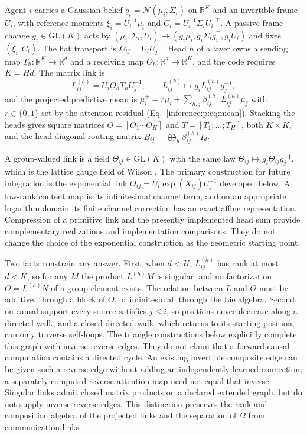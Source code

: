 \documentclass[11pt]{article}
\theoremstyle{definition}
\theoremstyle{remark}
\providecommand{\GL}{\mathrm{GL}}
\begin{document}
Agent $i$ carries a Gaussian belief $q_i=\mathcal N(\mu_i,\Sigma_i)$ on $\mathbb R^K$ and an invertible frame $U_i$, with reference moments $\xi_i=U_i^{-1}\mu_i$ and $C_i=U_i^{-1}\Sigma_iU_i^{-\top}$. A passive frame change $g_i\in\GL(K)$ acts by $(\mu_i,\Sigma_i,U_i)\mapsto(g_i\mu_i,g_i\Sigma_ig_i^\top,g_iU_i)$ and fixes $(\xi_i,C_i)$. The flat transport is $\Omega_{ij}=U_iU_j^{-1}$. Head $h$ of a layer owns a sending map $T_h:\mathbb R^K\to\mathbb R^d$ and a receiving map $O_h:\mathbb R^d\to\mathbb R^K$, and the code requires $K=Hd$. The matrix link is
\begin{equation}
L_{ij}^{(h)}=U_iO_hT_hU_j^{-1},\qquad L_{ij}^{(h)}\mapsto g_iL_{ij}^{(h)}g_j^{-1},
\label{links:origin:eq:link}
\end{equation}
and the projected predictive mean is $\mu_i^+=r\mu_i+\sum_{h,j}\beta_{ij}^{(h)}L_{ij}^{(h)}\mu_j$ with $r\in\{0,1\}$ set by the attention residual (Eq.~\eqref{inference:p:eq:mean}). Stacking the heads gives square matrices $O=[O_1\cdots O_H]$ and $T=[T_1;\dots;T_H]$, both $K\times K$, and the head-diagonal routing matrix $B_{ij}=\bigoplus_h\beta_{ij}^{(h)}I_d$.

A group-valued link is a field $\Theta_{ij}\in\GL(K)$ with the same law $\Theta_{ij}\mapsto g_i\Theta_{ij}g_j^{-1}$, which is the lattice gauge field of Wilson \cite{links:wilson1974}. The primary construction for future integration is the exponential link $\Theta_{ij}=U_i\exp(X_{ij})U_j^{-1}$ developed below. A low-rank content map is its infinitesimal channel term, and on an appropriate logarithm domain its finite channel correction has an exact affine representation. Compression of a primitive link and the presently implemented head sum provide complementary realizations and implementation comparisons. They do not change the choice of the exponential construction as the geometric starting point.

Two facts constrain any answer. First, when $d<K$, $L_{ij}^{(h)}$ has rank at most $d<K$, so for any $M$ the product $L^{(h)}M$ is singular, and no factorization $\Theta=L^{(h)}N$ of a group element exists. The relation between $L$ and $\Theta$ must be additive, through a block of $\Theta$, or infinitesimal, through the Lie algebra. Second, on causal support every source satisfies $j\le i$, so positions never decrease along a directed walk, and a closed directed walk, which returns to its starting position, can only traverse self-loops. The triangle constructions below explicitly complete this graph with inverse reverse edges. They do not claim that a forward causal computation contains a directed cycle. An existing invertible composite edge can be given such a reverse edge without adding an independently learned connection; a separately computed reverse attention map need not equal that inverse. Singular links admit closed matrix products on a declared extended graph, but do not supply inverse reverse edges. This distinction preserves the rank and composition algebra of the projected links and the separation of $\Omega$ from communication links \cite{links:wilson1974,links:kogut1979}.
\end{document}
